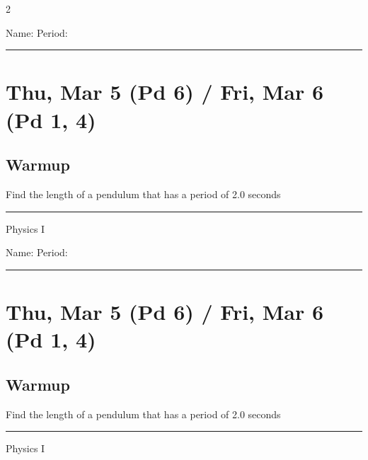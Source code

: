 \documentclass[10pt,landscape]{exam}
\def\todayDate{Thu, Mar 5 (Pd 6) / Fri, Mar 6 (Pd 1, 4)}
\def\content{
Find the length of a pendulum that has a period of 2.0 seconds
}
\begin{document}
\pagestyle{empty}

\setlength{\columnsep}{0.8in}
\begin{multicols*}{2}

\noindent  
Name: \hfill Period: \hspace{5em}
\vspace{0.5em}
\hrule

\section*{\todayDate}
\subsection*{Warmup}

\content

\vfill
\hrule
\vspace{0.5em}
\hfill {\sc Physics I}

\columnbreak

\noindent  
Name: \hfill Period: \hspace{5em}
\vspace{0.5em}
\hrule

\section*{\todayDate}
\subsection*{Warmup}

\content

\vfill
\hrule
\vspace{0.5em}
\hfill {\sc Physics I}

\end{multicols*}
\end{document}
